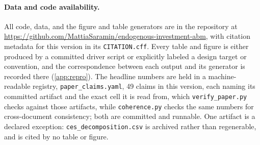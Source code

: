 \paragraph{Data and code availability.}
All code, data, and the figure and table generators are in the repository at
\url{https://github.com/MattiaSaramin/endogenous-investment-abm}, with citation
metadata for this version in its \texttt{CITATION.cff}. Every table and figure
is either produced by a committed driver script or explicitly labeled a design
target or convention, and the correspondence between each output and its
generator is recorded there (\cref{app:repro}). The headline numbers are held in
a machine-readable registry, \texttt{paper\_claims.yaml}, 49 claims in this
version, each naming its committed artifact and the exact cell it is read from, which \texttt{verify\_paper.py} checks against those artifacts, while
\texttt{coherence.py} checks the same numbers for cross-document consistency;
both are committed and runnable. One artifact is a declared exception:
\texttt{ces\_decomposition.csv} is archived rather than regenerable, and is
cited by no table or figure.
